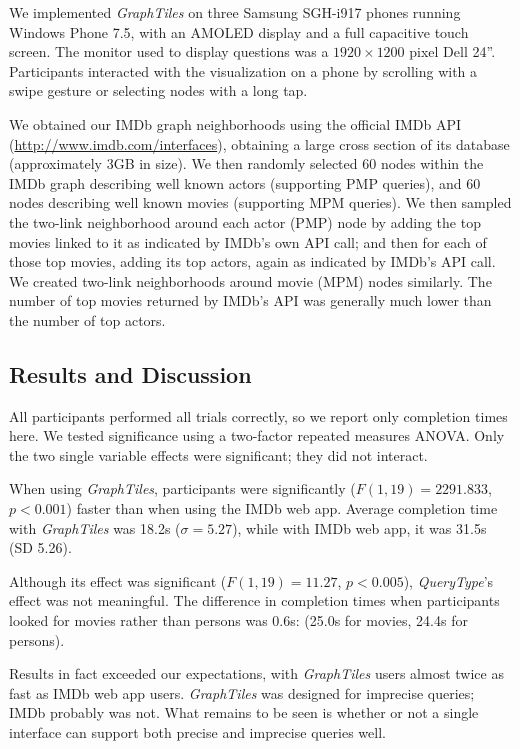 \documentclass{sigchi}
\begin{document}
We implemented \textit{GraphTiles} on three Samsung SGH-i917 phones running Windows Phone 7.5, with an AMOLED display and a full capacitive touch screen. The monitor used to display questions was a $1920 \times 1200$ pixel Dell 24''. Participants interacted with the visualization on a phone by scrolling with a swipe gesture or selecting nodes with a long tap.

We obtained our IMDb graph neighborhoods using the official IMDb API (\url{http://www.imdb.com/interfaces}), obtaining a large cross section of its database (approximately 3GB in size). We then randomly selected 60 nodes within the IMDb graph describing well known actors (supporting PMP queries), and 60 nodes describing well known movies (supporting MPM queries). We then sampled the two-link neighborhood around each actor (PMP) node by adding the top movies linked to it as indicated by IMDb's own API call; and then for each of those top movies, adding its top actors, again as indicated by IMDb's API call. We created two-link neighborhoods around movie (MPM) nodes similarly. The number of top movies returned by IMDb's API was generally much lower than the number of top actors. 


\subsection{Results and Discussion}

All participants performed all trials correctly, so we report only completion times here. We tested significance using a two-factor repeated measures ANOVA. Only the two single variable effects were significant; they did not interact. 

When using \textit{GraphTiles}, participants were significantly ($F(1,19)=2291.833$, $p<0.001$) faster than when using the IMDb web app. Average completion time with \textit{GraphTiles} was 18.2s ($\sigma =5.27$), while with IMDb web app, it was 31.5s (SD 5.26).

Although its effect was significant ($F(1,19)=11.27$, $p<0.005$), \textit{QueryType}'s effect was not meaningful. The difference in completion times when participants looked for movies rather than persons was 0.6s: (25.0s for movies, 24.4s for persons). 


Results in fact exceeded our expectations, with \textit{GraphTiles} users almost twice as fast as IMDb web app users. \textit{GraphTiles} was designed for imprecise queries; IMDb probably was not. What remains to be seen is whether or not a single interface can support both precise and imprecise queries well.
\end{document}
